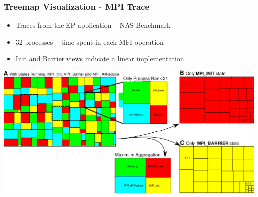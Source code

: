 \frame
{
   \frametitle{Treemap Visualization - MPI Trace}

   \begin{itemize}
   \item Traces from the EP application -- NAS Benchmark
   \item 32 processes -- time spent in each MPI operation
   \item Init and Barrier views indicate a linear implementation
   \end{itemize}

   \vfill
   \includegraphics[width=\textwidth]{img/mpi-scenario.pdf}
}
